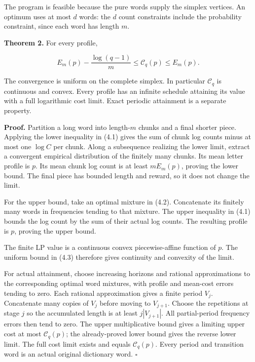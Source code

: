 The program is feasible because the pure words supply the simplex vertices. An optimum uses at most \(d\) words: the \(d\) count constraints include the probability constraint, since each word has length \(m\).

\textbf{Theorem 2.} For every profile,

\[
\boxed{
E_m(p)-\frac{\log(q-1)}m
\le\mathcal C_q(p)\le E_m(p).
}
\tag{4.3}
\]

The convergence is uniform on the complete simplex. In particular \(\mathcal C_q\) is continuous and convex. Every profile has an infinite schedule attaining its value with a full logarithmic cost limit. Exact periodic attainment is a separate property.

\textbf{Proof.} Partition a long word into length-\(m\) chunks and a final shorter piece. Applying the lower inequality in (4.1) gives the sum of chunk log counts minus at most one \(\log C\) per chunk. Along a subsequence realizing the lower limit, extract a convergent empirical distribution of the finitely many chunks. Its mean letter profile is \(p\). Its mean chunk log count is at least \(mE_m(p)\), proving the lower bound. The final piece has bounded length and reward, so it does not change the limit.

For the upper bound, take an optimal mixture in (4.2). Concatenate its finitely many words in frequencies tending to that mixture. The upper inequality in (4.1) bounds the log count by the sum of their actual log counts. The resulting profile is \(p\), proving the upper bound.

The finite LP value is a continuous convex piecewise-affine function of \(p\). The uniform bound in (4.3) therefore gives continuity and convexity of the limit.

For actual attainment, choose increasing horizons and rational approximations to the corresponding optimal word mixtures, with profile and mean-cost errors tending to zero. Each rational approximation gives a finite period \(V_j\). Concatenate many copies of \(V_j\) before moving to \(V_{j+1}\). Choose the repetitions at stage \(j\) so the accumulated length is at least \(j|V_{j+1}|\). All partial-period frequency errors then tend to zero. The upper multiplicative bound gives a limiting upper cost at most \(\mathcal C_q(p)\); the already-proved lower bound gives the reverse lower limit. The full cost limit exists and equals \(\mathcal C_q(p)\). Every period and transition word is an actual original dictionary word. \(\square\)

